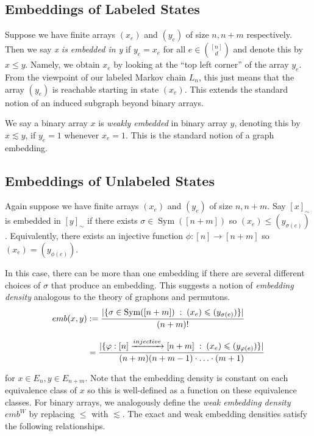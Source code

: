 \subsection{Embeddings of Labeled States}

Suppose we have finite arrays $(x_e)$ and $(y_e)$ of size $n, n+m$ respectively.
Then we say \textit{x is embedded in y} if $y_e = x_e$ for
all $e \in \binom{[n]}{d}$ and denote this by $x \leq y$. Namely, we obtain $x_e$ by
looking at the ``top left corner'' of the array $y_e$. From the viewpoint of our
labeled Markov chain $L_n$, this just means that the array $(y_e)$ is reachable starting in
state $(x_e)$. This extends the standard notion of an induced subgraph beyond binary arrays.

We say a binary array $x$ is \textit{weakly embedded} in binary array $y$, denoting this
by $x \lesssim y$, if $y_e = 1$ whenever $x_e = 1$. This is the standard notion of a graph embedding.

\subsection{Embeddings of Unlabeled States}

\noindent Again suppose we have finite arrays $(x_e)$ and $(y_e)$ of size $n, n+m$.
Say $[x]_\sim$ is embedded in $[y]_\sim$ if there exists $\sigma \in \operatorname{Sym}([n+m])$ so $(x_e) \leq (y_{\sigma(e)})$.
Equivalently, there exists an injective function $\phi:[n] \to [n+m]$ so $(x_{e}) = (y_{\phi(e)})$.

In this case, there can be more than one embedding if there are several
different choices of $\sigma$ that produce an embedding.
This suggests a notion of \textit{embedding density} analogous to the
theory of graphons and permutons.
%
\begin{align}
    emb(x,y) & := \frac{| \{\sigma \in \operatorname{Sym}([n+m]) \; : \; (x_e) \leq (y_{\sigma(e)}) \}|}{(n+m)!} \notag\\[7pt]
            & = \frac{| \{\phi:[n] \xrightarrow{injective} [n+m] \; : \; (x_{e}) \leq (y_{\phi(e)}) \}|}{(n+m) (n+m-1) \cdot \ldots \cdot (m+1)}
    \label{def:embedding_density}
\end{align}

\noindent for $x \in E_n, y \in E_{n+m}$. Note that the embedding
density is constant on each equivalence class of $x$ so this is
well-defined as a function on these equivalence classes.
For binary arrays, we analogously define the \textit{weak embedding density}
$emb^W$ by replacing $\leq$ with $\lesssim$. The exact and weak embedding
densities satisfy the following relationships.

